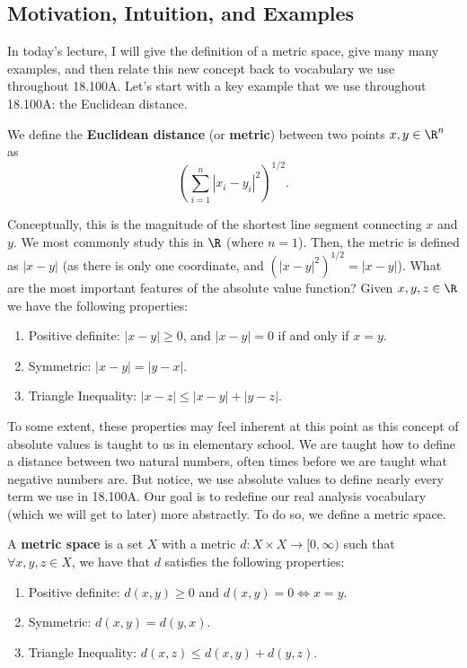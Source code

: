 
\subsection*{Motivation, Intuition, and Examples}
In today's lecture, I will give the definition of a metric space, give many many examples, and then relate this new concept back to vocabulary we use throughout 18.100A. Let's start with a key example that we use throughout 18.100A: the Euclidean distance.

\begin{example}
We define the \textbf{Euclidean distance} (or \textbf{metric}) between two points $x,y\in \R^n$ as 
\[
\left(\sum_{i=1}^n |x_i-y_i|^2\right)^{1/2}.
\]
\end{example}

Conceptually, this is the magnitude of the shortest line segment connecting $x$ and $y$. We most commonly study this in $\R$ (where $n=1$). Then, the metric is defined as $|x-y|$ (as there is only one coordinate, and $(|x-y|^2)^{1/2} = |x-y|$). What are the most important features of the absolute value function? Given $x,y,z\in \R$ we have the following properties:
\begin{enumerate}
    \item Positive definite: $|x-y| \geq 0$, and $|x-y| = 0$ if and only if $x=y$.
    \item Symmetric: $|x-y| = |y-x|$.
    \item Triangle Inequality: $|x-z| \leq |x-y| + |y-z|$.
\end{enumerate}
To some extent, these properties may feel inherent at this point as this concept of absolute values is taught to us in elementary school. We are taught how to define a distance between two natural numbers, often times before we are taught what negative numbers are. But notice, we use absolute values to define nearly every term we use in 18.100A. Our goal is to redefine our real analysis vocabulary (which we will get to later) more abstractly. To do so, we define a metric space.

\begin{definition}
A \textbf{metric space} is a set $X$ with a metric $d:X\times X \to [0,\infty)$ such that $\forall x,y,z\in X$, we have that $d$ satisfies the following properties: 
\begin{enumerate}
    \item Positive definite: $d(x,y) \geq 0$ and $d(x,y) = 0 \iff x=y$.
    \item Symmetric: $d(x,y) = d(y,x)$.
    \item Triangle Inequality: $d(x,z) \leq d(x,y) + d(y,z)$.
\end{enumerate}
\end{definition}

